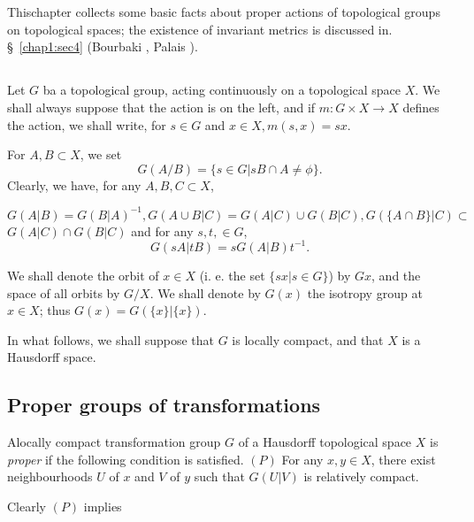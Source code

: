\chapter{}\label{chap1}%

This\pageoriginale chapter collects some basic facts about proper actions of
topological groups on topological spaces; the existence of invariant
metrics is discussed in. \S\ \ref{chap1:sec4}  (Bourbaki \cite{key1},
Palais \cite{key1}).  

\setcounter{section}{-1}
\section{}%
Let $G$ ba a topological group, acting continuously on a topological
space $X$. We shall always suppose that the action is on the left, and
if $m : G \times X \to X$ defines the action, we shall write, for $s
\in G$ and $x \in X, m(s, x)=sx$. 


\medskip
{}
For $A, B \subset X$, we set
$$
G(A/B) = \bigg\{s \in G \big| sB \cap A \neq \phi \bigg\}.
$$
Clearly, we have, for any $A, B, C \subset X$,

\noindent
$G(A| B) = G(B|A)^{-1}, G(A \cup B|C) = G(A | C) \cup G(B|C), G (\{A
\cap B \} | C) \subset$ $G(A|C) \cap G (B | C)$ and for any $s, t, \in G$,  
$$
G(sA | tB) = s G(A | B)t^{-1}.
$$

We shall denote the orbit of $x \in X$ (i. e. the set $\{sx | s \in G
\}$) by $Gx$, and the space of all orbits by $G\slash X$. We shall
denote by $G(x)$ the isotropy group at $x \in X$; thus $G(x) =
G(\{x\}| \{x\})$. 

In what follows, we shall suppose that $G$ is locally compact, and that
$X$ is a Hausdorff space. 

\section{Proper groups of transformations}\label{chap1:sec1}%

\begin{defi*}
A\pageoriginale locally compact transformation group $G$ of a Hausdorff topological
space $X$ is \textit{proper} if the following condition is
satisfied. $(P)$ For any $x, y \in X$, there exist neighbourhoods $U$
of $x$ and $V$ of $y$ such that $G(U | V)$ is relatively compact. 
\end{defi*}

Clearly $(P)$ implies


